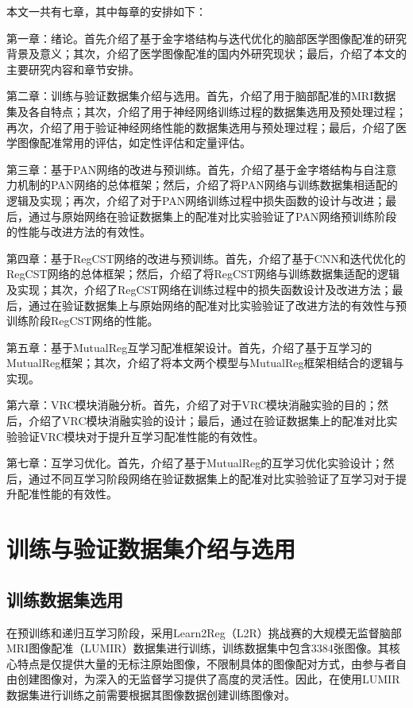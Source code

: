 本文一共有七章，其中每章的安排如下：

第一章：绪论。首先介绍了基于金字塔结构与迭代优化的脑部医学图像配准的研究背景及意义；其次，介绍了医学图像配准的国内外研究现状；最后，介绍了本文的主要研究内容和章节安排。

第二章：训练与验证数据集介绍与选用。首先，介绍了用于脑部配准的MRI数据集及各自特点；其次，介绍了用于神经网络训练过程的数据集选用及预处理过程；再次，介绍了用于验证神经网络性能的数据集选用与预处理过程；最后，介绍了医学图像配准常用的评估，如定性评估和定量评估。

第三章：基于PAN网络的改进与预训练。首先，介绍了基于金字塔结构与自注意力机制的PAN网络的总体框架；然后，介绍了将PAN网络与训练数据集相适配的逻辑及实现；再次，介绍了对于PAN网络训练过程中损失函数的设计与改进；最后，通过与原始网络在验证数据集上的配准对比实验验证了PAN网络预训练阶段的性能与改进方法的有效性。

第四章：基于RegCST网络的改进与预训练。首先，介绍了基于CNN和迭代优化的RegCST网络的总体框架；然后，介绍了将RegCST网络与训练数据集适配的逻辑及实现；其次，介绍了RegCST网络在训练过程中的损失函数设计及改进方法；最后，通过在验证数据集上与原始网络的配准对比实验验证了改进方法的有效性与预训练阶段RegCST网络的性能。

第五章：基于MutualReg互学习配准框架设计。首先，介绍了基于互学习的MutualReg框架；其次，介绍了将本文两个模型与MutualReg框架相结合的逻辑与实现。

第六章：VRC模块消融分析。首先，介绍了对于VRC模块消融实验的目的；然后，介绍了VRC模块消融实验的设计；最后，通过在验证数据集上的配准对比实验验证VRC模块对于提升互学习配准性能的有效性。

第七章：互学习优化。首先，介绍了基于MutualReg的互学习优化实验设计；然后，通过不同互学习阶段网络在验证数据集上的配准对比实验验证了互学习对于提升配准性能的有效性。

\chapter{训练与验证数据集介绍与选用}

\section{训练数据集选用}

在预训练和递归互学习阶段，采用Learn2Reg（L2R）挑战赛的大规模无监督脑部MRI图像配准（LUMIR）数据集进行训练，训练数据集中包含3384张图像。其核心特点是仅提供大量的无标注原始图像，不限制具体的图像配对方式，由参与者自由创建图像对，为深入的无监督学习提供了高度的灵活性。因此，在使用LUMIR数据集进行训练之前需要根据其图像数据创建训练图像对。

